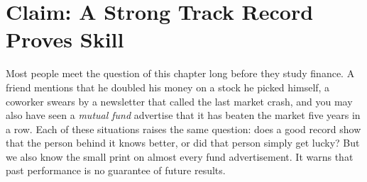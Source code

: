 \providecommand{\term}[1]{\emph{#1}}
\makeatletter
{}
\makeatother

\chapter{Claim: A Strong Track Record Proves Skill}
\label{ch:01}

Most people meet the question of this chapter long before they study finance. A friend mentions that he doubled his money on a stock he picked himself, a coworker swears by a newsletter that called the last market crash, and you may also have seen a \term{mutual fund} advertise that it has beaten the market five years in a row.
Each of these situations raises the same question: does a good record show that the person behind it knows better, or did that person simply get lucky? But we also know the small print on almost every fund advertisement. It warns that past performance is no guarantee of future results.

